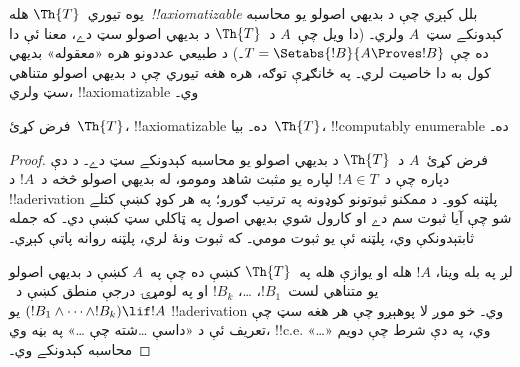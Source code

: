 \documentclass[../../../include/open-logic-section]{subfiles}
\begin{document}


يوه تيوري~$\Th{T}$ هله~\emph{!!{axiomatizable}} بلل کېږي چې د بديهي
اصولو يو محاسبه کېدونکے سټ~$A$ ولري۔ (دا ويل چې~$A$ د~$\Th{T}$
د بديهي اصولو سټ دے، معنا ئې دا ده چې
$T = \Setabs{!B}{A \Proves !B}$۔)
د طبيعي عددونو هره «معقوله» بديهي کول به دا خاصيت لري۔ په ځانګړې
توګه، هره هغه تيوري چې د بديهي اصولو متناهي سټ ولري،
!!{axiomatizable} وي۔

\begin{lem}
فرض کړئ~$\Th{T}$، !!{axiomatizable} ده۔ بيا~$\Th{T}$،
!!{computably
enumerable} ده۔
\end{lem}

\begin{proof}
فرض کړئ~$A$ د~$\Th{T}$ د بديهي اصولو يو محاسبه کېدونکے سټ دے۔ د
دې دپاره چې د~$!A \in T$ لپاره يو مثبت شاهد ومومو، له بديهي اصولو څخه
د~$!A$ د !!a{derivation} پلټنه کوو۔ د ممکنو ثبوتونو کوډونه په ترتيب ګورو؛ په هر کوډ کښې کتلے شو چې آيا ثبوت سم دے او کارول شوي بديهي اصول په ټاکلي سټ کښې دي۔ که جمله ثابتېدونکې وي، پلټنه ئې يو ثبوت مومي۔ که ثبوت ونۀ لري، پلټنه روانه پاتې کېږي۔

لږ په بله وينا، $!A$ هله او يوازې هله په~$\Th{T}$ کښې ده چې
په~$A$ کښې د بديهي اصولو يو متناهي لست~$!B_1$، \dots، $!B_k$ او
په لومړۍ درجې منطق کښې د~$(!B_1 \land \dots \land !B_k) \lif !A$
يو !!a{derivation} وي۔ خو موږ لا پوهېږو چې هر هغه سټ چې تعريف ئې د
«داسې \dots شته چې \dots» په بڼه وي، !!{c.e.} وي، په دې شرط چې
دويم «\dots» محاسبه کېدونکے وي۔
\end{proof}
\end{document}
